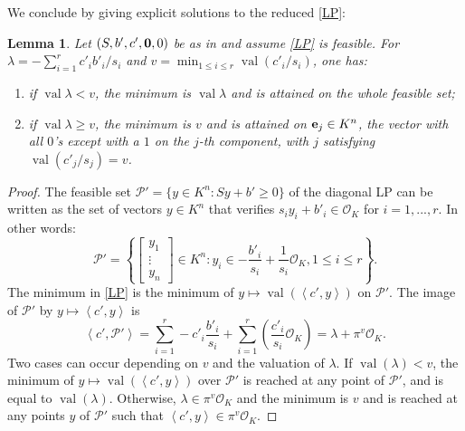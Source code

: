 \documentclass[a4paper,oneside,10pt]{article}
\newtheorem{lemma}[theorem]{Lemma}
\newcommand{\PP}{\mathcal{P}}
\DeclareMathOperator{\val}{val}
\newcommand{\OK}{\mathcal{O}_K}
\begin{document}
We conclude by giving explicit solutions to the reduced \eqref{LP}:

\begin{lemma}\label{solutions}
  Let $(S,b',c',{\bf 0}, 0)$ be as in  and assume \eqref{LP} is feasible.
  For $\lambda = -\sum_{i=1}^r c'_i b'_i/s_i$ and $v = \min_{1\le i\le r} \val (c'_i/s_i)$,
  one has:
  \begin{enumerate}
  \item
    if $\val \lambda < v$, the minimum is $\val \lambda$ and is attained on the whole feasible
    set; \label{solutions:it1}
  \item
    if $\val \lambda \geq v$, the minimum is $v$ and is attained on
    ${\bf e}_j \in K^n$, the vector with all $0$'s except with a $1$ on the $j$-th component,
    with $j$ satisfying $\val (c'_j/s_j) = v$. \label{solutions:it2}
  \end{enumerate}
\end{lemma}
\begin{proof}
  The feasible set $\PP' = \{y \in K^n : Sy+b' \geq 0\}$ of the diagonal LP can be written
  as the set of vectors $y \in K^n$ that verifies $s_i y_i + b'_i \in \OK$ for $i=1,...,r$.
  In other words:
  $$
  \PP' = \left\{\left[\begin{smallmatrix} y_1\\ \vdots\\ y_n \end{smallmatrix}\right] \in K^n :
  y_i \in -\frac{b'_i}{s_i} + \frac{1}{s_i} \OK, 1\le i\le r\right\}.
  $$
  The minimum in \eqref{LP} is the minimum of
  $y \mapsto \val\left(\left\langle c',y \right\rangle\right)$ on $\PP'$.
  The image of $\PP'$ by $y \mapsto \left\langle c',y \right\rangle$ is
  \[
  \left\langle c',\PP' \right\rangle = \sum_{i=1}^r -c'_i \frac{b'_i}{s_i} + \sum_{i=1}^r\left( \frac{c'_i}{s_{i}} \OK \right) = \lambda + \pi^{v} \OK.
  \]
  Two cases can occur depending on $v$ and the valuation of $\lambda$.
  If $\val(\lambda) < v$, the minimum of $y\mapsto \val\left(\left\langle c',y \right\rangle\right)$ over $\PP'$ is reached at any point of $\PP'$, and is equal to $\val(\lambda)$.
  Otherwise, $\lambda \in \pi^{v} \OK$ and the minimum is $v$ and is reached at any points $y$ of $\PP'$ such that
  $\left<c',y \right> \in \pi^v\OK$.
\end{proof}
\end{document}
